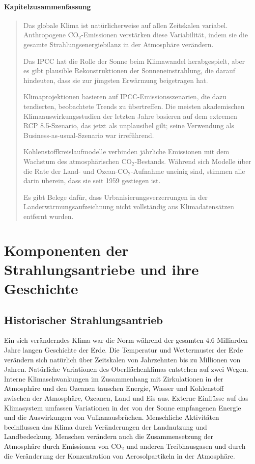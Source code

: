 \documentclass[12pt,paper=a4,DIV=12,parskip=never,chapterprefix=false,headings=standardclasses]{scrreprt}
\begin{document}
\paragraph{Kapitelzusammenfassung}
\begin{quote}
Das globale Klima ist natürlicherweise auf allen Zeitskalen variabel. Anthropogene CO$_2$-Emissionen verstärken diese Variabilität, indem sie die gesamte Strahlungsenergiebilanz in der Atmosphäre verändern.

Das IPCC hat die Rolle der Sonne beim Klimawandel herabgespielt, aber es gibt plausible Rekonstruktionen der Sonneneinstrahlung, die darauf hindeuten, dass sie zur jüngsten Erwärmung beigetragen hat.

Klimaprojektionen basieren auf IPCC-Emissionsszenarien, die dazu tendierten, beobachtete Trends zu übertreffen. Die meisten akademischen Klimaauswirkungsstudien der letzten Jahre basieren auf dem extremen RCP 8.5-Szenario, das jetzt als unplausibel gilt; seine Verwendung als Business-as-usual-Szenario war irreführend.

Kohlenstoffkreislaufmodelle verbinden jährliche Emissionen mit dem Wachstum des atmosphärischen CO$_2$-Bestands. Während sich Modelle über die Rate der Land- und Ozean-CO$_2$-Aufnahme uneinig sind, stimmen alle darin überein, dass sie seit 1959 gestiegen ist.

Es gibt Belege dafür, dass Urbanisierungsverzerrungen in der Landerwärmungsaufzeichnung nicht vollständig aus Klimadatensätzen entfernt wurden.
\end{quote}

\section{Komponenten der Strahlungsantriebe und ihre Geschichte}
\subsection{Historischer Strahlungsantrieb}
Ein sich veränderndes Klima war die Norm während der gesamten 4.6 Milliarden Jahre langen Geschichte der Erde. Die Temperatur und Wettermuster der Erde verändern sich natürlich über Zeitskalen von Jahrzehnten bis zu Millionen von Jahren. Natürliche Variationen des Oberflächenklimas entstehen auf zwei Wegen. Interne Klimaschwankungen im Zusammenhang mit Zirkulationen in der Atmosphäre und den Ozeanen tauschen Energie, Wasser und Kohlenstoff zwischen der Atmosphäre, Ozeanen, Land und Eis aus. Externe Einflüsse auf das Klimasystem umfassen Variationen in der von der Sonne empfangenen Energie und die Auswirkungen von Vulkanausbrüchen. Menschliche Aktivitäten beeinflussen das Klima durch Veränderungen der Landnutzung und Landbedeckung. Menschen verändern auch die Zusammensetzung der Atmosphäre durch Emissionen von CO$_2$ und anderen Treibhausgasen und durch die Veränderung der Konzentration von Aerosolpartikeln in der Atmosphäre.
\end{document}

